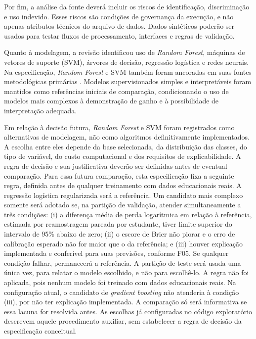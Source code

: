 Por fim, a análise da fonte deverá incluir os riscos de identificação, discriminação e uso indevido. Esses riscos são condições de governança da execução, e não apenas atributos técnicos do arquivo de dados. Dados sintéticos poderão ser usados para testar fluxos de processamento, interfaces e regras de validação.

Quanto à modelagem, a revisão identificou uso de \textit{Random Forest}, máquinas de vetores de suporte (SVM), árvores de decisão, regressão logística e redes neurais. Na especificação, \textit{Random Forest} e SVM também foram ancoradas em suas fontes metodológicas primárias \cite{Breiman2001,CortesVapnik1995}. Modelos supervisionados simples e interpretáveis foram mantidos como referências iniciais de comparação, condicionando o uso de modelos mais complexos à demonstração de ganho e à possibilidade de interpretação adequada.

Em relação à decisão futura, \textit{Random Forest} e SVM foram registrados como alternativas de modelagem, não como algoritmos definitivamente implementados. A escolha entre eles depende da base selecionada, da distribuição das classes, do tipo de variável, do custo computacional e dos requisitos de explicabilidade. A regra de decisão e sua justificativa deverão ser definidas antes de eventual comparação. Para essa futura comparação, esta especificação fixa a seguinte regra, definida antes de qualquer treinamento com dados educacionais reais. A regressão logística regularizada será a referência. Um candidato mais complexo somente será adotado se, na partição de validação, atender simultaneamente a três condições: (i) a diferença média de perda logarítmica em relação à referência, estimada por reamostragem pareada por estudante, tiver limite superior do intervalo de 95\% abaixo de zero; (ii) o escore de Brier não piorar e o erro de calibração esperado não for maior que o da referência; e (iii) houver explicação implementada e conferível para suas previsões, conforme F05. Se qualquer condição falhar, permanecerá a referência. A partição de teste será usada uma única vez, para relatar o modelo escolhido, e não para escolhê-lo. A regra não foi aplicada, pois nenhum modelo foi treinado com dados educacionais reais. Na configuração atual, o candidato de \textit{gradient boosting} não atenderia à condição (iii), por não ter explicação implementada. A comparação só será informativa se essa lacuna for resolvida antes. As escolhas já configuradas no código exploratório descrevem aquele procedimento auxiliar, sem estabelecer a regra de decisão da especificação conceitual.

